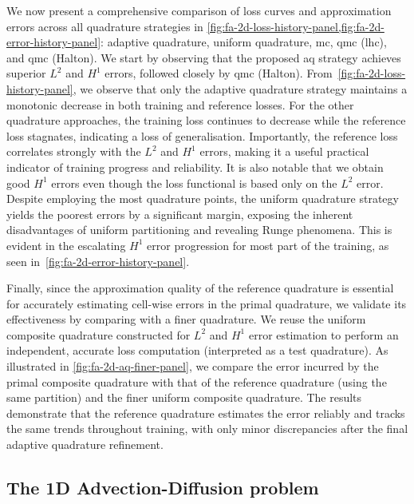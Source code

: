 \documentclass[oneside,reqno,11pt,a4paper]{amsart}
\theoremstyle{definition}
\begin{document}
We now present a comprehensive comparison of loss curves and approximation
errors across all quadrature strategies in
\cref{fig:fa-2d-loss-history-panel,fig:fa-2d-error-history-panel}: adaptive
quadrature, uniform quadrature, \ac{mc}, \ac{qmc} (\ac{lhc}), and \ac{qmc}
(Halton). We start by observing that the proposed \ac{aq} strategy achieves
superior $L^2$ and $H^1$ errors, followed closely by \ac{qmc} (Halton). 
From~\cref{fig:fa-2d-loss-history-panel}, we observe that only the adaptive
quadrature strategy maintains a monotonic decrease in both training and
reference losses. For the other quadrature approaches, the training loss
continues to decrease while the reference loss stagnates, indicating a loss of
generalisation. Importantly, the reference loss correlates strongly with the
$L^2$ and $H^1$ errors, making it a useful practical indicator of training
progress and reliability. It is also notable that we obtain good $H^1$ errors
even though the loss functional is based only on the $L^2$ error.
Despite employing the most quadrature points, the uniform
quadrature strategy yields the poorest errors by a significant margin,
exposing the inherent disadvantages of uniform partitioning and revealing
Runge phenomena. This is evident in the escalating $H^1$ error progression for
most part of the training, as seen in~\cref{fig:fa-2d-error-history-panel}.

Finally, since the approximation quality of the reference quadrature is
essential for accurately estimating cell-wise errors in the primal quadrature,
we validate its effectiveness by comparing with a finer quadrature. We reuse
the uniform composite quadrature constructed for $L^2$ and $H^1$ error
estimation to perform an independent, accurate loss computation (interpreted
as a test quadrature). As illustrated in
\cref{fig:fa-2d-aq-finer-panel}, we
compare the error incurred by the primal composite quadrature with that of the
reference quadrature (using the same partition) and the finer uniform composite
quadrature. The results demonstrate that the reference quadrature estimates the
error reliably and tracks the same trends throughout training, with only minor
discrepancies after the final adaptive quadrature refinement.

\subsection{The 1D Advection-Diffusion problem} \label{sec:1d-adv-diff}
\end{document}
